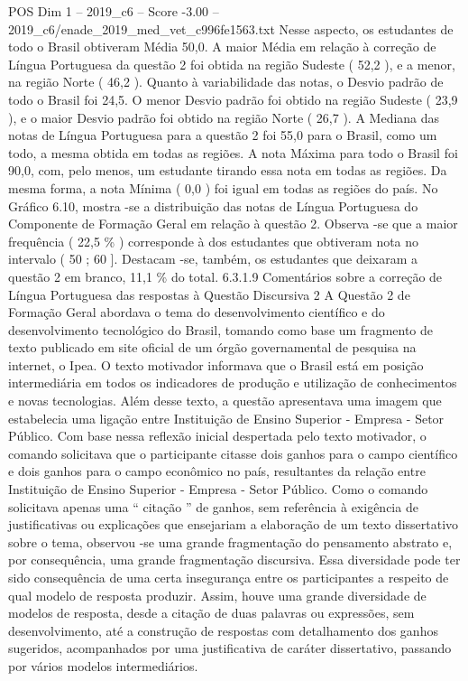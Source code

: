 \begin{textsample}{POS Dim 1 – 2019\_c6 – Score -3.00 – 2019\_c6/enade\_2019\_med\_vet\_c996fe1563.txt}
Nesse aspecto, os estudantes de todo o Brasil obtiveram Média 50,0.
A maior Média em relação à correção de Língua Portuguesa da questão 2 foi obtida na região Sudeste ( 52,2 ), e a menor, na região Norte ( 46,2 ).
Quanto à variabilidade das notas, o Desvio padrão de todo o Brasil foi 24,5.
O menor Desvio padrão foi obtido na região Sudeste ( 23,9 ), e o maior Desvio padrão foi obtido na região Norte ( 26,7 ).
A Mediana das notas de Língua Portuguesa para a questão 2 foi 55,0 para o Brasil, como um todo, a mesma obtida em todas as regiões.
A nota Máxima para todo o Brasil foi 90,0, com, pelo menos, um estudante tirando essa nota em todas as regiões.
Da mesma forma, a nota Mínima ( 0,0 ) foi igual em todas as regiões do país.
No Gráfico 6.10, mostra -se a distribuição das notas de Língua Portuguesa do Componente de Formação Geral em relação à questão 2.
Observa -se que a maior frequência ( 22,5 \% ) corresponde à dos estudantes que obtiveram nota no intervalo ( 50 ; 60 ].
Destacam -se, também, os estudantes que deixaram a questão 2 em branco, 11,1 \% do total. 6.3.1.9 Comentários sobre a correção de Língua Portuguesa das respostas à Questão Discursiva 2 A Questão 2 de Formação Geral abordava o tema do desenvolvimento científico e do desenvolvimento tecnológico do Brasil, tomando como base um fragmento de texto publicado em site oficial de um órgão governamental de pesquisa na internet, o Ipea.
O texto motivador informava que o Brasil está em posição intermediária em todos os indicadores de produção e utilização de conhecimentos e novas tecnologias.
Além desse texto, a questão apresentava uma imagem que estabelecia uma ligação entre Instituição de Ensino Superior - Empresa - Setor Público.
Com base nessa reflexão inicial despertada pelo texto motivador, o comando solicitava que o participante citasse dois ganhos para o campo científico e dois ganhos para o campo econômico no país, resultantes da relação entre Instituição de Ensino Superior - Empresa - Setor Público.
Como o comando solicitava apenas uma “ citação ” de ganhos, sem referência à exigência de justificativas ou explicações que ensejariam a elaboração de um texto dissertativo sobre o tema, observou -se uma grande fragmentação do pensamento abstrato e, por consequência, uma grande fragmentação discursiva.
Essa diversidade pode ter sido consequência de uma certa insegurança entre os participantes a respeito de qual modelo de resposta produzir.
Assim, houve uma grande diversidade de modelos de resposta, desde a citação de duas palavras ou expressões, sem desenvolvimento, até a construção de respostas com detalhamento dos ganhos sugeridos, acompanhados por uma justificativa de caráter dissertativo, passando por vários modelos intermediários.

\end{textsample}
